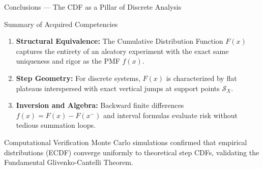\documentclass[aspectratio=169,xcolor={dvipsnames,table}]{beamer}
\begin{document}
\begin{frame}{Conclusions --- The CDF as a Pillar of Discrete Analysis}
	\begin{block}{Summary of Acquired Competencies}
		\small
		\begin{enumerate}
			\itemsep=0.06cm
			\item \textbf{Structural Equivalence:} The Cumulative Distribution Function $F(x)$ captures the entirety of an aleatory experiment with the exact same uniqueness and rigor as the PMF $f(x)$.
			\item \textbf{Step Geometry:} For discrete systems, $F(x)$ is characterized by flat plateaus interspersed with exact vertical jumps at support points $\mathcal{S}_X$.
			\item \textbf{Inversion and Algebra:} Backward finite differences $f(x) = F(x) - F(x^-)$ and interval formulas evaluate risk without tedious summation loops.
		\end{enumerate}
	\end{block}
	\vspace{-0.15cm}
	\begin{alertblock}{Computational Verification}
		\footnotesize
		Monte Carlo simulations confirmed that empirical distributions (ECDF) converge uniformly to theoretical step CDFs, validating the Fundamental Glivenko-Cantelli Theorem.
	\end{alertblock}
\end{frame}
\end{document}
